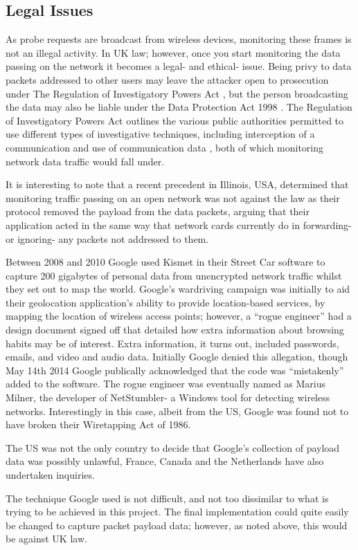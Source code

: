 \subsection{Legal Issues}
As probe requests are broadcast from wireless devices, monitoring these frames is not an illegal activity. In UK law; however, once you start monitoring the data passing on the network it becomes a legal- and ethical- issue. Being privy to data packets addressed to other users may leave the attacker open to prosecution under The Regulation of Investigatory Powers Act \cite{research:uk_law1}, but the person broadcasting the data may also be liable under the Data Protection Act 1998 \cite{research:uk_law2}. The Regulation of Investigatory Powers Act outlines the various public authorities permitted to use different types of investigative techniques, including interception of a communication and use of communication data \cite{research:uk_law3}, both of which monitoring network data traffic would fall under.

It is interesting to note that a recent precedent \cite{research:uk_law4} in Illinois, USA, determined that monitoring traffic passing on an open network was not against the law as their protocol removed the payload from the data packets, arguing that their application acted in the same way that network cards currently do in forwarding- or ignoring- any packets not addressed to them. 

Between 2008 and 2010 Google used Kismet in their Street Car software \cite{research:uk_law5} to capture 200 gigabytes of personal data from unencrypted network traffic whilst they set out to map the world. Google's wardriving campaign was initially to aid their geolocation application's ability to provide location-based services, by mapping the location of wireless access points; however, a ``rogue engineer'' had a design document signed off that detailed how extra information about browsing habits may be of interest. Extra information, it turns out, included passwords, emails, and video and audio data. Initially Google denied this allegation, though May 14th 2014 Google publically acknowledged that the code was ``mistakenly'' added to the software. The rogue engineer was eventually named as Marius Milner, the developer of NetStumbler- a Windows tool for detecting wireless networks. Interestingly in this case, albeit from the US, Google was found not to have broken their Wiretapping Act of 1986.

The US was not the only country to decide that Google's collection of payload data was possibly unlawful, France, Canada and the Netherlands have also undertaken inquiries.

The technique Google used is not difficult, and not too dissimilar to what is trying to be achieved in this project. The final implementation could quite easily be changed to capture packet payload data; however, as noted above, this would be against UK law.